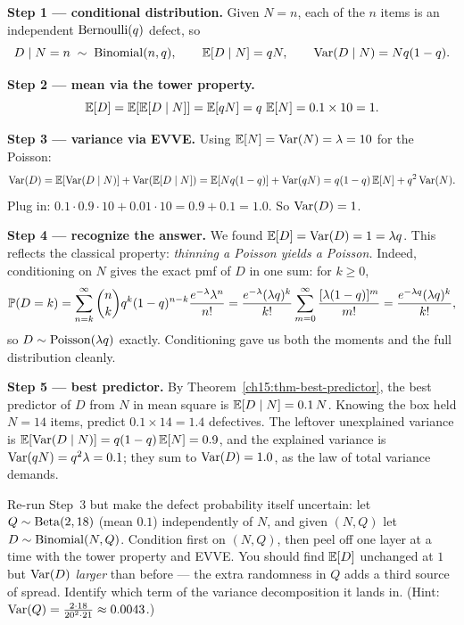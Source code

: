 \textbf{Step 1 --- conditional distribution.} Given $N = n$, each of the $n$ items is an independent
$\Bern(q)$ defect, so
\[
  D \given N = n \;\sim\; \Bin(n, q),
  \qquad \E[D\given N] = qN, \qquad \Var(D\given N) = N q (1-q).
\]

\textbf{Step 2 --- mean via the tower property.}
\[
  \E[D] = \E[\E[D\given N]] = \E[qN] = q\,\E[N] = 0.1 \times 10 = 1.
\]

\textbf{Step 3 --- variance via EVVE.} Using $\E[N] = \Var(N) = \lambda = 10$ for the Poisson:
\[
  \Var(D) = \E[\Var(D\given N)] + \Var(\E[D\given N])
          = \E[Nq(1-q)] + \Var(qN)
          = q(1-q)\E[N] + q^2 \Var(N).
\]
Plug in: $0.1\cdot 0.9\cdot 10 + 0.01\cdot 10 = 0.9 + 0.1 = 1.0$. So $\Var(D) = 1$.

\textbf{Step 4 --- recognize the answer.} We found $\E[D] = \Var(D) = 1 = \lambda q$. This
reflects the classical property: \emph{thinning a Poisson yields a Poisson.} Indeed, conditioning on
$N$ gives the exact pmf of $D$ in one sum: for $k \ge 0$,
\[
  \P(D = k) = \sum_{n=k}^{\infty} \binom{n}{k} q^k (1-q)^{n-k} \frac{e^{-\lambda}\lambda^n}{n!}
  = \frac{e^{-\lambda}(\lambda q)^k}{k!} \sum_{m=0}^{\infty} \frac{[\lambda(1-q)]^m}{m!}
  = \frac{e^{-\lambda q}(\lambda q)^k}{k!},
\]
so $D \sim \Pois(\lambda q)$ exactly. Conditioning gave us both the moments and the full distribution cleanly.

\textbf{Step 5 --- best predictor.} By Theorem~\ref{ch15:thm-best-predictor}, the best predictor of $D$
from $N$ in mean square is $\E[D\given N] = 0.1\,N$. Knowing the box held $N = 14$ items, predict
$0.1 \times 14 = 1.4$ defectives. The leftover unexplained variance is $\E[\Var(D\given N)] =
q(1-q)\E[N] = 0.9$, and the explained variance is $\Var(qN) = q^2\lambda = 0.1$; they sum to
$\Var(D) = 1.0$, as the law of total variance demands.

\begin{labbox}
Re-run Step~3 but make the defect probability itself uncertain: let $Q \sim \Bet(2, 18)$ (mean $0.1$)
independently of $N$, and given $(N, Q)$ let $D \sim \Bin(N, Q)$. Condition first on $(N, Q)$, then peel
off one layer at a time with the tower property and EVVE. You should find $\E[D]$ unchanged at $1$ but
$\Var(D)$ \emph{larger} than before --- the extra randomness in $Q$ adds a third source of spread.
Identify which term of the variance decomposition it lands in. (Hint: $\Var(Q) = \frac{2\cdot 18}
{20^2\cdot 21} \approx 0.0043$.)
\end{labbox}

